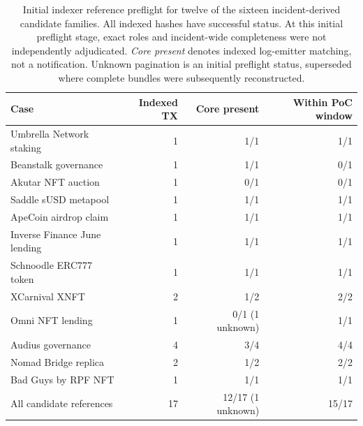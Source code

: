 \begin{table}[H]
\centering\small
\caption{Initial indexer reference preflight for twelve of the sixteen incident-derived candidate families. All indexed hashes have successful status. At this initial preflight stage, exact roles and incident-wide completeness were not independently adjudicated. \emph{Core present} denotes indexed log-emitter matching, not a notification. Unknown pagination is an initial preflight status, superseded where complete bundles were subsequently reconstructed.}
\label{tab:refpreflight}
\begin{tabularx}{\linewidth}{@{}>{\raggedright\arraybackslash}X r r r@{}}
\toprule
Case & Indexed TX & Core present & Within PoC window\\
\midrule
Umbrella Network staking & 1 & 1/1 & 1/1\\
Beanstalk governance & 1 & 1/1 & 0/1\\
Akutar NFT auction & 1 & 0/1 & 0/1\\
Saddle sUSD metapool & 1 & 1/1 & 1/1\\
ApeCoin airdrop claim & 1 & 1/1 & 1/1\\
Inverse Finance June lending & 1 & 1/1 & 1/1\\
Schnoodle ERC777 token & 1 & 1/1 & 1/1\\
XCarnival XNFT & 2 & 1/2 & 2/2\\
Omni NFT lending & 1 & 0/1 (1 unknown) & 1/1\\
Audius governance & 4 & 3/4 & 4/4\\
Nomad Bridge replica & 2 & 1/2 & 2/2\\
Bad Guys by RPF NFT & 1 & 1/1 & 1/1\\
\midrule
All candidate references & 17 & 12/17 (1 unknown) & 15/17\\
\bottomrule
\end{tabularx}
\end{table}
